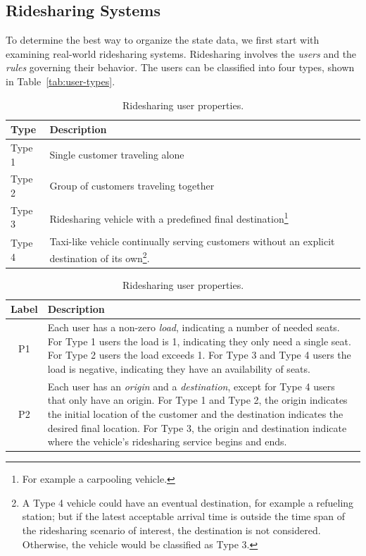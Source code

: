 \documentclass{article}
\newcommand{\hi}[1]{\noindent {\bf #1}}
\theoremstyle{definition}
\begin{document}
\subsection{Ridesharing Systems}
\label{sec:ridesharing-systems}
To determine the best way to organize the state data, we first start with
examining real-world ridesharing systems.  Ridesharing involves the
\emph{users} and the \emph{rules} governing their behavior. The users can be
classified into four types, shown in Table~\ref{tab:user-types}.
\begin{table}[h]
\centering
\small
\caption{Types of ridesharing users.}
\label{tab:user-types}
\begin{tabular}{|l|l|}
\hline
Type   & Description \\
\hline
Type 1 & Single customer traveling alone \\
Type 2 & Group of customers traveling together \\
\hline
Type 3 & Ridesharing vehicle with a predefined final
    destination\footnote{For example a carpooling vehicle.} \\
Type 4 & Taxi-like vehicle continually serving customers without an
    explicit destination of its own\footnote{A Type 4 vehicle could have an
    eventual destination, for example a refueling station; but if the latest
    acceptable arrival time is outside the time span of the ridesharing
    scenario of interest, the destination is not considered. Otherwise, the
    vehicle would be classified as Type 3.}. \\
\hline
\end{tabular}
\caption{Ridesharing user properties.}
\label{tab:user-properties}
\begin{tabular}{|c|p{140mm}|}
\hline
Label & Description \\
\hline
P1 & \hi{Load.} Each user has a non-zero \emph{load}, indicating a
number of needed seats. For Type 1 users the load is 1, indicating they only
need a single seat. For Type 2 users the load exceeds 1. For Type 3 and Type 4
users the load is negative, indicating they have an availability of seats. \\
\hline
P2 & \hi{Origin and Destination.} Each user has an \emph{origin} and a
\emph{destination}, except for Type 4 users that only have an origin.  For Type
1 and Type 2, the origin indicates the initial location of the customer
and the destination indicates the desired final location.  For Type 3, the
origin and destination indicate where the vehicle's ridesharing service begins
and ends.\\

\end{tabular}
\end{table}
\end{document}
